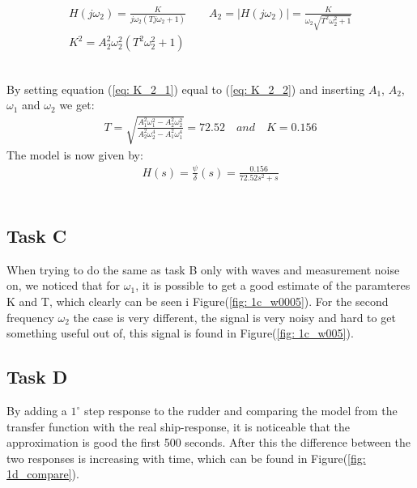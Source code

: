 \begin{equations}
    \begin{align}
        H(j\omega_2) = \frac{K}{j\omega_2(Tj\omega_2 + 1)} \qquad A_2 = |H(j\omega_2)| = \frac{K}{\omega_2\sqrt{T^2\omega_2^2 + 1}} \nonumber \\
        K^2 = A_2^2\omega_2^2(T^2\omega_2^2 + 1) \label{eq: K_2_2}
    \end{align}
\end{equations}
\\
By setting equation (\ref{eq: K_2_1}) equal to (\ref{eq: K_2_2}) and inserting $A_1$, $A_2$, $\omega_1$ and $\omega_2$ we get:
\begin{equation}
    \begin{align}
        T = \sqrt{\frac{A_1^2\omega_1^2 - A_2^2\omega_2^2}{A_2^2\omega_2^4 - A_1^2\omega_1^4}} = 72.52 \quad and \quad K = 0.156
    \end{align}
\end{equation}
\newpage
The model is now given by:
\begin{equation}
    \begin{align}
        H(s) = \frac{\psi}{\delta}(s) = \frac{0.156}{72.52s^2+s}
    \end{align}
\end{equation}
\\

\subsection{Task C}
When trying to do the same as task B only with waves and measurement noise on, we noticed that for $\omega_1$, it is possible to get a good estimate of the paramteres K and T, which clearly can be seen i Figure(\ref{fig: 1c_w0005}). For the second frequency $\omega_2$ the case is very different, the signal is very noisy and hard to get something useful out of, this signal is found in Figure(\ref{fig: 1c_w005}).
\\

\subsection{Task D}
By adding a $1^{\circ}$ step response to the rudder and comparing the model from the transfer function with the real ship-response, it is noticeable that the approximation is good the first 500 seconds. After this the difference between the two responses is increasing with time, which can be found in Figure(\ref{fig: 1d_compare}).
\newpage

